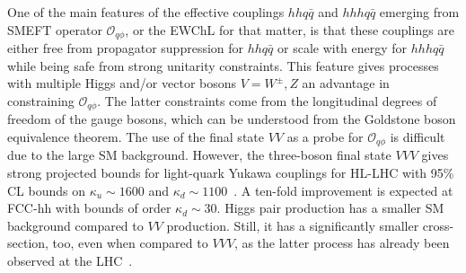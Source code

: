 One of the main features of the effective couplings $hh q\bar q$ and $hhh q\bar q$ emerging from SMEFT operator $\mathcal O_{q\phi}$, or the EWChL for that matter, is that these couplings are either free from propagator suppression for $hh q\bar q$ or scale with energy for $hhh q\bar q$ while being safe from strong unitarity constraints. This feature gives processes with multiple Higgs and/or vector bosons $V= W^\pm, Z$ an advantage in constraining $\mathcal O_{q\phi}$. The latter constraints come from the longitudinal degrees of freedom of the gauge bosons, which can be understood from the Goldstone boson equivalence theorem. The use of the final state $VV$ as a probe for $\mathcal O_{q\phi}$ is difficult due to the large SM background. However, the three-boson final state $VVV$ gives strong projected bounds for light-quark Yukawa couplings for HL-LHC with 95\% CL bounds on $\kappa_u \sim 1600$ and $\kappa_d\sim 1100$~\cite{Falkowski:2020znk}. A ten-fold improvement is expected at FCC-hh with bounds of order $\kappa_d\sim 30$. 
Higgs pair production has a smaller SM background compared to $VV$ production. Still, it has a significantly smaller cross-section, too, even when compared to $VVV$, as the latter process has already been observed at the LHC~\cite{Sciandra:2688061,CMS-PAS-SMP-19-014}.

